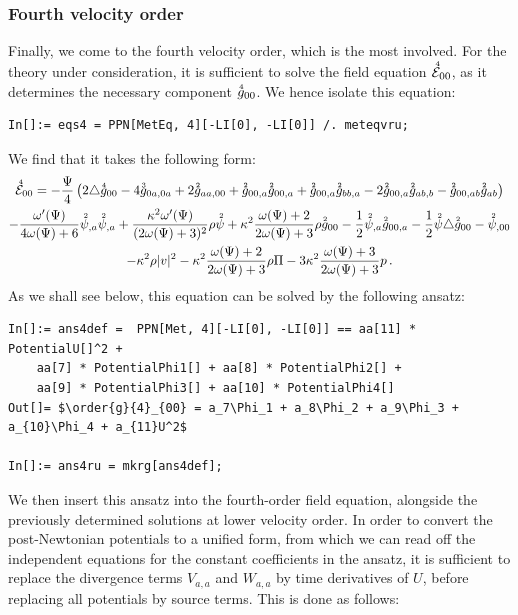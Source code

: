 \documentclass[notitlepage,a4paper,aps,prd,onecolumn,superscriptaddress,nofootinbib,groupedaddress,longbibliography]{revtex4-1}
\newcommand{\order}[2]{\accentset{#2}{#1}}
\begin{document}
\subsubsection{Fourth velocity order}\label{sssec:vel4}
Finally, we come to the fourth velocity order, which is the most involved. For the theory under consideration, it is sufficient to solve the field equation \(\order{\mathcal{E}}{4}_{00}\), as it determines the necessary component \(\order{g}{4}_{00}\). We hence isolate this equation:
\begin{lstlisting}
In[]:= eqs4 = PPN[MetEq, 4][-LI[0], -LI[0]] /. meteqvru;
\end{lstlisting}
We find that it takes the following form:
\begin{multline}
\order{\mathcal{E}}{4}_{00} = -\frac{\Psi}{4}\left(2\triangle\order{g}{4}_{00} - 4\order{g}{3}_{0a,0a} + 2\order{g}{2}_{aa,00} + \order{g}{2}_{00,a}\order{g}{2}_{00,a} + \order{g}{2}_{00,a}\order{g}{2}_{bb,a} - 2\order{g}{2}_{00,a}\order{g}{2}_{ab,b} - \order{g}{2}_{00,ab}\order{g}{2}_{ab}\right)\\
- \frac{\omega'(\Psi)}{4\omega(\Psi) + 6}\order{\psi}{2}_{,a}\order{\psi}{2}_{,a} + \frac{\kappa^2\omega'(\Psi)}{(2\omega(\Psi) + 3)^2}\rho\order{\psi}{2} + \kappa^2\frac{\omega(\Psi) + 2}{2\omega(\Psi) + 3}\rho\order{g}{2}_{00} - \frac{1}{2}\order{\psi}{2}_{,a}\order{g}{2}_{00,a} - \frac{1}{2}\order{\psi}{2}\triangle\order{g}{2}_{00} - \order{\psi}{2}_{,00}\\
- \kappa^2\rho|v|^2 - \kappa^2\frac{\omega(\Psi) + 2}{2\omega(\Psi) + 3}\rho\Pi - 3\kappa^2\frac{\omega(\Psi) + 3}{2\omega(\Psi) + 3}p\,.
\end{multline}
As we shall see below, this equation can be solved by the following ansatz:
\begin{lstlisting}
In[]:= ans4def =  PPN[Met, 4][-LI[0], -LI[0]] == aa[11] * PotentialU[]^2 +
	aa[7] * PotentialPhi1[] + aa[8] * PotentialPhi2[] +
	aa[9] * PotentialPhi3[] + aa[10] * PotentialPhi4[]
Out[]= $\order{g}{4}_{00} = a_7\Phi_1 + a_8\Phi_2 + a_9\Phi_3 + a_{10}\Phi_4 + a_{11}U^2$

In[]:= ans4ru = mkrg[ans4def];
\end{lstlisting}
We then insert this ansatz into the fourth-order field equation, alongside the previously determined solutions at lower velocity order. In order to convert the post-Newtonian potentials to a unified form, from which we can read off the independent equations for the constant coefficients in the ansatz, it is sufficient to replace the divergence terms \(V_{a,a}\) and \(W_{a,a}\) by time derivatives of \(U\), before replacing all potentials by source terms. This is done as follows:
\end{document}
